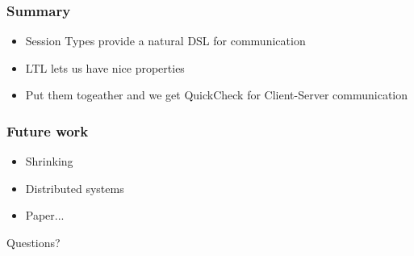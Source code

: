 \documentclass{beamer}
\begin{document}
\begin{frame}
    \frametitle{Summary}
    \begin{itemize}
        \item Session Types provide a natural DSL for communication
        \item LTL lets us have nice properties
        \item Put them togeather and we get QuickCheck for Client-Server communication
    \end{itemize}
\end{frame}

\begin{frame}
    \frametitle{Future work}
    \begin{itemize}
        \item Shrinking
        \item Distributed systems
        \item Paper...
    \end{itemize}
\end{frame}
\begin{frame}
    \Huge{\centerline{Questions?}}
\end{frame}
\end{document}
